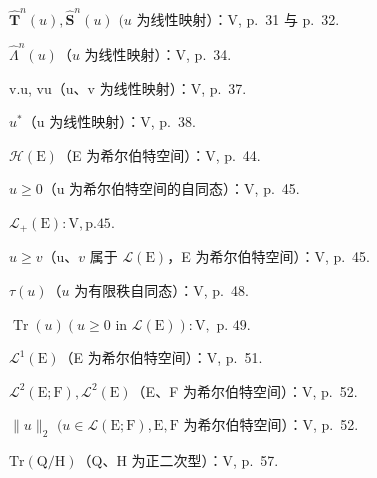 \(\hat{\mathbf{T}}^n (u),\hat{\mathbf{S}}^n (u)\) \((u\) 为线性映射）：V, p.~31 与 p.~32.

\(\hat{\Lambda}^n (u)\)（\(u\) 为线性映射）：V, p.~34.

v.u, vu（u、v 为线性映射）：V, p.~37.

\(u^{*}\)（u 为线性映射）：V, p.~38.

\(\mathcal{H}(\mathrm{E})\)（E 为希尔伯特空间）：V, p.~44.

\(u \geqslant 0\)（u 为希尔伯特空间的自同态）：V, p.~45.

\(\mathcal{L}_{+}(\mathrm{E}):\mathrm{V},\mathrm{p.}45.\)

\(u \geqslant v\)（u、\(v\) 属于 \(\mathcal{L}(\mathrm{E})\)，E 为希尔伯特空间）：V, p.~45.

\(\tau (u)\)（\(u\) 为有限秩自同态）：V, p.~48.

\(\operatorname{Tr}(u) (u \geqslant 0 \text{ in } \mathcal{L}(\mathrm{E})): \mathrm{V}, \text{ p. } 49.\)

\(\mathcal{L}^1 (\mathrm{E})\)（E 为希尔伯特空间）：V, p.~51.

\(\mathcal{L}^2 (\mathrm{E};\mathrm{F}),\mathcal{L}^2 (\mathrm{E})\)（E、F 为希尔伯特空间）：V, p.~52.

\(\| u\| _2\) \((u\in \mathcal{L}(\mathrm{E};\mathrm{F}),\mathrm{E},\mathrm{F}\) 为希尔伯特空间）：V, p.~52.

\(\mathrm{Tr}(\mathrm{Q} / \mathrm{H})\)（Q、H 为正二次型）：V, p.~57.

